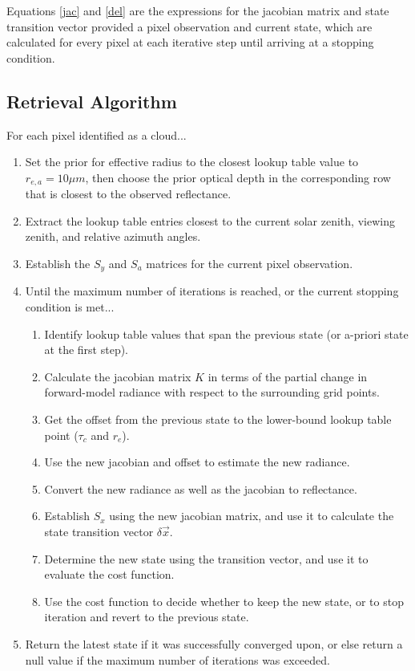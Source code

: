 \documentclass[12pt]{article}
\begin{document}
Equations \ref{jac} and \ref{del} are the expressions for the jacobian matrix and state transition vector provided a pixel observation and current state, which are calculated for every pixel at each iterative step until arriving at a stopping condition.

\subsection{Retrieval Algorithm}\label{dcomp_algo}

\noindent
For each pixel identified as a cloud...
\begin{enumerate}
    \item Set the prior for effective radius to the closest lookup table value to $r_{e,a} = 10\mu m$, then choose the prior optical depth in the corresponding row that is closest to the observed reflectance.
    \item Extract the lookup table entries closest to the current solar zenith, viewing zenith, and relative azimuth angles.
    \item Establish the $S_y$ and $S_a$ matrices for the current pixel observation.
    \item Until the maximum number of iterations is reached, or the current stopping condition is met...
        \begin{enumerate}[label*=\arabic*.]
            \item Identify lookup table values that span the previous state (or a-priori state at the first step).
            \item Calculate the jacobian matrix $K$ in terms of the partial change in forward-model radiance with respect to the surrounding grid points.
            \item Get the offset from the previous state to the lower-bound lookup table point ($\tau_c$ and $r_e$).
            \item Use the new jacobian and offset to estimate the new radiance.
            \item Convert the new radiance as well as the jacobian to reflectance.
            \item Establish $S_x$ using the new jacobian matrix, and use it to calculate the state transition vector $\delta \vec{x}$.
            \item Determine the new state using the transition vector, and use it to evaluate the cost function.
            \item Use the cost function to decide whether to keep the new state, or to stop iteration and revert to the previous state.
        \end{enumerate}
    \item Return the latest state if it was successfully converged upon, or else return a null value if the maximum number of iterations was exceeded.
\end{enumerate}
\end{document}
